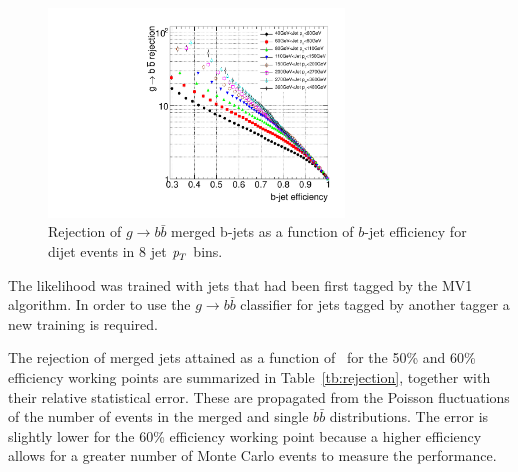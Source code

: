 \begin{figure}[tp]
\centering
\includegraphics[width=0.7\textwidth]{FIGS/Likelihood/KDE_RejvsEff.pdf}
\caption{Rejection of $g\rightarrow b \bar{b}$ merged b-jets as a function of $b$-jet efficiency for dijet events in 8 jet ${\emph{p}_{T}}$ bins.}
\label{fig:performanceinbins}
\end{figure}

The likelihood was trained with jets that had been first tagged by the MV1 algorithm. In order to use the  $g\rightarrow b \bar{b}$ classifier for jets tagged by another tagger a new training is required.

The rejection of merged jets attained as a function of \pt\ for the 50\% and 60\% efficiency working points are summarized in Table~\ref{tb:rejection}, together with their relative statistical error. These are propagated from the Poisson fluctuations of the number of events in the merged and single $b\bar{b}$ distributions. The error is slightly lower for the 60\% efficiency working point because a higher efficiency allows for a greater number of Monte Carlo events to measure the performance. %




